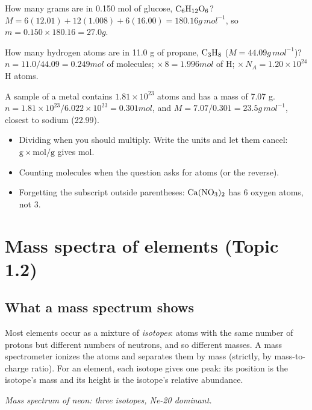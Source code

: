 \documentclass[11pt]{article}
\begin{document}
 How many grams are in 0.150 mol of glucose, $\ce{C6H12O6}$? $M = 6(12.01) + 12(1.008) + 6(16.00) = 180.16\unit{g\,mol^{-1}}$, so $m = 0.150 \times 180.16 = 27.0\unit{g}$.

 How many hydrogen atoms are in 11.0 g of propane, $\ce{C3H8}$ ($M = 44.09\unit{g\,mol^{-1}}$)? $n = 11.0/44.09 = 0.249\unit{mol}$ of molecules; $\times\,8 = 1.996\unit{mol}$ of H; $\times\,N_A = 1.20\times10^{24}$ H atoms.

 A sample of a metal contains $1.81\times10^{23}$ atoms and has a mass of 7.07 g. $n = 1.81\times10^{23}/6.022\times10^{23} = 0.301\unit{mol}$, and $M = 7.07/0.301 = 23.5\unit{g\,mol^{-1}}$, closest to sodium (22.99).

\errorsh
\begin{itemize}
\item Dividing when you should multiply. Write the units and let them cancel: $\mathrm{g} \times \mathrm{mol/g}$ gives mol.
\item Counting molecules when the question asks for atoms (or the reverse).
\item Forgetting the subscript outside parentheses: $\ce{Ca(NO3)2}$ has 6 oxygen atoms, not 3.
\end{itemize}

\section{Mass spectra of elements (Topic 1.2)}\label{t:1.2}
\subsection{What a mass spectrum shows}
Most elements occur as a mixture of \emph{isotopes}: atoms with the same number of protons but different numbers of neutrons, and so different masses. A mass spectrometer ionizes the atoms and separates them by mass (strictly, by mass-to-charge ratio). For an element, each isotope gives one peak: its position is the isotope's mass and its height is the isotope's relative abundance.

\begin{center}

{\small\itshape Mass spectrum of neon: three isotopes, Ne-20 dominant.}
\end{center}
\end{document}
